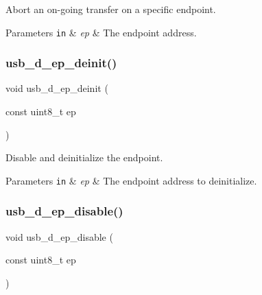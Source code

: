 Abort an on-\/going transfer on a specific endpoint. 


\begin{DoxyParams}[1]{Parameters}
\mbox{\tt in}  & {\em ep} & The endpoint address. \\
\hline
\end{DoxyParams}
\mbox{\label{group__doc__driver__hal__usb__device_ga3e51e415f97d69a86d19f70774bbb4e5}} 
\subsubsection{\texorpdfstring{usb\+\_\+d\+\_\+ep\+\_\+deinit()}{usb\_d\_ep\_deinit()}}
{\footnotesize\ttfamily void usb\+\_\+d\+\_\+ep\+\_\+deinit (\begin{DoxyParamCaption}\item[{const uint8\+\_\+t}]{ep }\end{DoxyParamCaption})}



Disable and deinitialize the endpoint. 


\begin{DoxyParams}[1]{Parameters}
\mbox{\tt in}  & {\em ep} & The endpoint address to deinitialize. \\
\hline
\end{DoxyParams}
\mbox{\label{group__doc__driver__hal__usb__device_gade6576a693b632af3351ac7574356470}} 
\subsubsection{\texorpdfstring{usb\+\_\+d\+\_\+ep\+\_\+disable()}{usb\_d\_ep\_disable()}}
{\footnotesize\ttfamily void usb\+\_\+d\+\_\+ep\+\_\+disable (\begin{DoxyParamCaption}\item[{const uint8\+\_\+t}]{ep }\end{DoxyParamCaption})}



